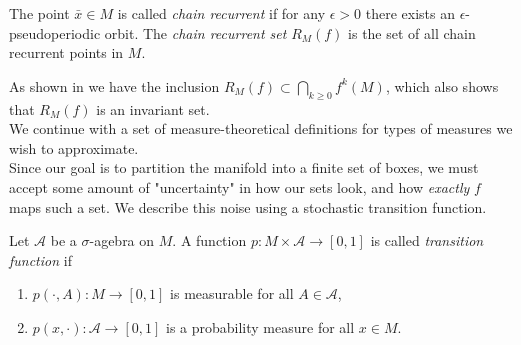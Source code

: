 \begin{definition}
    \cite*{dynbook} The point $\bar{x} \in M$ is called \emph{chain recurrent} if for any $\epsilon > 0$ 
    there exists an $\epsilon$-pseudoperiodic orbit. The \emph{chain recurrent set} $R_M(f)$ 
    is the set of all chain recurrent points in $M$.
\end{definition}

As shown in \cite*{algGAIO} we have the inclusion $R_M(f) \subset \bigcap_{k \geq 0} f^k(M)$,
which also shows that $R_M(f)$ is an invariant set. \\

We continue with a set of measure-theoretical definitions for types of measures we wish to 
approximate. \\

Since our goal is to partition the manifold into a finite set of boxes, we must accept some
amount of "uncertainty" in how our sets look, and how \emph{exactly} $f$ maps such a set.
We describe this noise using a stochastic transition function. 

\begin{definition}
    \cite*{attr} Let $\mathcal{A}$ be a $\sigma$-agebra on $M$. A function 
    $p : M \times \mathcal{A} \to [0,1]$ is called \emph{transition function} if

    \begin{enumerate}
        \item $p(\cdot, A) : M \to [0,1]$ is measurable for all $A \in \mathcal{A}$,
        \item $p(x, \cdot) : \mathcal{A} \to [0,1]$ is a probability measure for all $x \in M$.
    \end{enumerate}

\end{definition}

